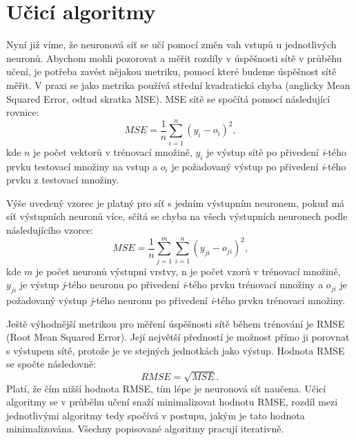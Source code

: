 \documentclass[11pt,twoside,a4paper]{book}
\begin{document}
\section{Učicí algoritmy}
Nyní již víme, že neuronová síť se učí pomocí změn vah vstupů u jednotlivých neuronů. Abychom mohli pozorovat a měřit rozdíly v úspěšnosti sítě v průběhu učení, je potřeba zavést nějakou metriku, pomocí které budeme úspěšnost sítě měřit. V praxi se jako metrika používá střední kvadratická chyba (anglicky Mean Squared Error, odtud skratka MSE). MSE sítě se spočítá pomocí následující rovnice:
\begin{equation}
	MSE=\frac{1}{n}\sum\limits_{i=1}^n (y_{i}-o_{i})^{2}\mbox{,}
\end{equation}
 kde \begin{math}n\end{math} je počet vektorů v trénovací množině,  \begin{math}y_{i}\end{math} je výstup sítě po přivedení \textit{i}-tého prvku testovací množiny na vstup a \begin{math}o_{i}\end{math} je požadovaný výstup po přivedení \textit{i}-tého prvku z testovací množiny.

Výše uvedený vzorec je platný pro síť s jedním výstupním neuronem, pokud má síť výstupních neuronů více, sčítá se chyba na všech výstupních neuronech podle následujícího vzorce:
\begin{equation}
	MSE=\frac{1}{n}\sum\limits_{j=1}^m\sum\limits_{i=1}^n (y_{ji}-o_{ji})^{2}\mbox{,} 
\end{equation}
kde \begin{math}m\end{math} je počet neuronů výstupní vrstvy, n je počet vzorů v trénovací množině, \begin{math}y_{ji}\end{math} je výstup \textit{j}-tého neuronu po přivedení \textit{i}-tého prvku trénovací množiny a \begin{math}o_{ji}\end{math} je požadovaný výstup \textit{j}-tého neuronu po přivedení \textit{i}-tého prvku trénovací množiny.

Ještě výhodnější metrikou pro měření úspěšnosti sítě během trénování je RMSE (Root Mean Squared Error). Její největší předností je možnost přímo ji porovnat s výstupem sítě, protože je ve stejných jednotkách jako výstup. Hodnota RMSE se spočte následovně:
\begin{equation}
RMSE=\sqrt{MSE}\mbox{.}
\end{equation}
Platí, že čím nižší hodnota RMSE, tím lépe je neuronová síť naučena. Učicí algoritmy se v průběhu učení snaží minimalizovat hodnotu RMSE, rozdíl mezi jednotlivými algoritmy tedy spočívá v postupu, jakým je tato hodnota minimalizována. Všechny popisované algoritmy pracují iterativně.
\end{document}

